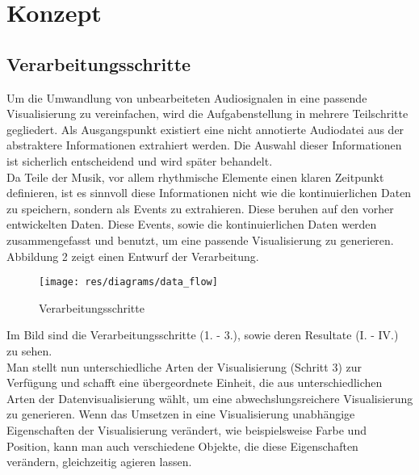 \documentclass[11pt,a4paper]{article}
\begin{document}


\section{Konzept}
\subsection{Verarbeitungsschritte}
Um die Umwandlung von unbearbeiteten Audiosignalen in eine passende Visualisierung zu vereinfachen, wird die Aufgabenstellung in mehrere Teilschritte gegliedert. Als Ausgangspunkt existiert eine nicht annotierte Audiodatei aus der abstraktere Informationen extrahiert werden. Die Auswahl dieser Informationen ist sicherlich entscheidend und wird später behandelt.\\
Da Teile der Musik, vor allem rhythmische Elemente einen klaren Zeitpunkt definieren, ist es sinnvoll diese Informationen nicht wie die kontinuierlichen Daten zu speichern, sondern als Events zu extrahieren. Diese beruhen auf den vorher entwickelten Daten. Diese Events, sowie die kontinuierlichen Daten werden zusammengefasst und benutzt, um eine passende Visualisierung zu generieren. Abbildung 2 zeigt einen Entwurf der Verarbeitung.
\begin{figure}[ht!]
\texttt{[image: res/diagrams/data\_flow]}
\caption[Verarbeitungsschritte]{Verarbeitungsschritte}
\end{figure}

\noindent
Im Bild sind die Verarbeitungsschritte (1. - 3.), sowie deren Resultate (I. - IV.) zu sehen.\\
Man stellt nun unterschiedliche Arten der Visualisierung (Schritt 3) zur Verfügung und schafft eine übergeordnete Einheit, die aus unterschiedlichen Arten der Datenvisualisierung wählt, um eine abwechslungsreichere Visualisierung zu generieren. Wenn das Umsetzen in eine Visualisierung unabhängige Eigenschaften der Visualisierung verändert, wie beispielsweise Farbe und Position, kann man auch verschiedene Objekte, die diese Eigenschaften verändern, gleichzeitig agieren lassen.
\end{document}
